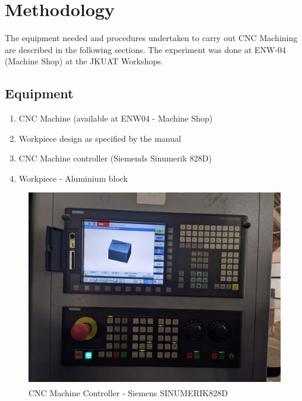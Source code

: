 \section{Methodology}
\lhead{\leftmark}
The equipment needed and procedures undertaken to carry out CNC Machining are described in the following sections. The experiment was done at ENW-04 (Machine Shop) at the JKUAT Workshops.
\subsection{Equipment}
\begin{enumerate}
\item CNC Machine (available at ENW04 - Machine Shop)
\item Workpiece design as specified by the manual
\item CNC Machine controller (Siemends Sinumerik 828D)
\item Workpiece - Aluminium block 
\end{enumerate}
\begin{figure}[h!]
	\centering
	\includegraphics[width=0.7\linewidth]{Figures/machinecontroller}
	\caption[CNC Machine Controller]{CNC Machine Controller - Siemens SINUMERIK\textsuperscript\textregistered 828D} 
	\label{fig:cnccontroller}
\end{figure}
